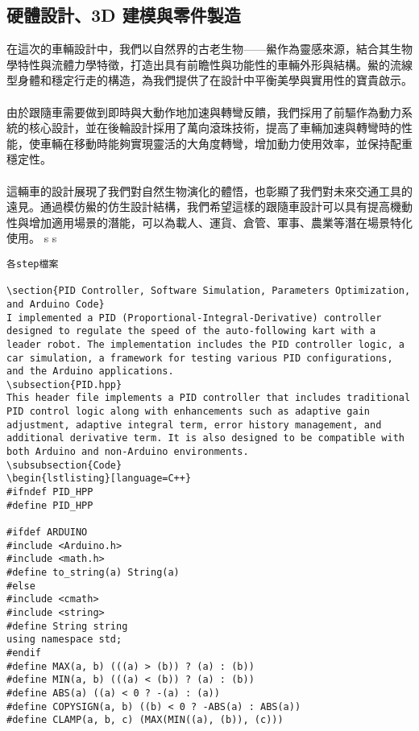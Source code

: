 \documentclass[a4paper,12pt]{report}
\begin{document}
\begin{lstlising}[language=C++]
\section{硬體設計、3D 建模與零件製造}
在這次的車輛設計中，我們以自然界的古老生物——鱟作為靈感來源，結合其生物學特性與流體力學特徵，打造出具有前瞻性與功能性的車輛外形與結構。鱟的流線型身體和穩定行走的構造，為我們提供了在設計中平衡美學與實用性的寶貴啟示。\\\\
由於跟隨車需要做到即時與大動作地加速與轉彎反饋，我們採用了前驅作為動力系統的核心設計，並在後輪設計採用了萬向滾珠技術，提高了車輛加速與轉彎時的性能，使車輛在移動時能夠實現靈活的大角度轉彎，增加動力使用效率，並保持配重穩定性。\\\\
這輛車的設計展現了我們對自然生物演化的體悟，也彰顯了我們對未來交通工具的遠見。通過模仿鱟的仿生設計結構，我們希望這樣的跟隨車設計可以具有提高機動性與增加適用場景的潛能，可以為載人、運貨、倉管、軍事、農業等潛在場景特化使用。
\ssc s
\bctf{}\efct
\ssc s
\begin{lstlisting}各step檔案

\section{PID Controller, Software Simulation, Parameters Optimization, and Arduino Code}
I implemented a PID (Proportional-Integral-Derivative) controller designed to regulate the speed of the auto-following kart with a leader robot. The implementation includes the PID controller logic, a car simulation, a framework for testing various PID configurations, and the Arduino applications.
\subsection{PID.hpp}
This header file implements a PID controller that includes traditional PID control logic along with enhancements such as adaptive gain adjustment, adaptive integral term, error history management, and additional derivative term. It is also designed to be compatible with both Arduino and non-Arduino environments.
\subsubsection{Code}
\begin{lstlisting}[language=C++}
#ifndef PID_HPP
#define PID_HPP

#ifdef ARDUINO
#include <Arduino.h>
#include <math.h>
#define to_string(a) String(a)
#else
#include <cmath>
#include <string>
#define String string
using namespace std;
#endif
#define MAX(a, b) (((a) > (b)) ? (a) : (b))
#define MIN(a, b) (((a) < (b)) ? (a) : (b))
#define ABS(a) ((a) < 0 ? -(a) : (a))
#define COPYSIGN(a, b) ((b) < 0 ? -ABS(a) : ABS(a))
#define CLAMP(a, b, c) (MAX(MIN((a), (b)), (c)))


\end{lstlisting}
\end{lstlising}
\end{document}
